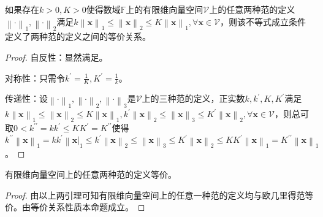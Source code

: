 \documentclass[main.tex]{subfiles}
\begin{document}
\begin{lemma}\label{lem:A.2}
    如果存在$k>0,K>0$使得数域$\mathbb{F}$上的有限维向量空间$\mathcal{V}$上的任意两种范的定义$\left\|\cdot\right\|_1,\left\|\cdot\right\|_2$满足$k\left\|\mathbf{x}\right\|_1\leq\left\|\mathbf{x}\right\|_2\leq K\left\|\mathbf{x}\right\|_1,\forall\mathbf{x}\in\mathcal{V}$，则该不等式成立条件定义了两种范的定义之间的等价关系。
\end{lemma}
\begin{proof}
    自反性：显然满足。

    对称性：只需令$k^\prime=\frac{1}{K},K^\prime=\frac{1}{k}$。

    传递性：设$\left\|\cdot\right\|_1,\left\|\cdot\right\|_2,\left\|\cdot\right\|_3$是$\mathcal{V}$上的三种范的定义，正实数$k,k^\prime,K,K^\prime$满足$k\left\|\mathbf{x}\right\|_1\leq\left\|\mathbf{x}\right\|_2\leq K\left\|\mathbf{x}\right\|_1,k^\prime\left\|\mathbf{x}\right\|_2\leq\left\|\mathbf{x}\right\|_3\leq K^\prime\left\|\mathbf{x}\right\|_2,\forall\mathbf{x}\in\mathcal{V}$，则总可取$0<k^{\prime\prime}=kk^\prime\leq KK^\prime=K^{\prime\prime}$使得$k^{\prime\prime}\left\|\mathbf{x}\right\|_1=kk^\prime\left\|\mathbf{x}\right|_1\leq k^\prime\left\|\mathbf{x}\right\|_2\leq\left\|\mathbf{x}\right\|_3\leq K^\prime\left\|\mathbf{x}\right\|_2\leq KK^\prime\left\|\mathbf{x}\right\|_1=K^{\prime\prime}\left\|\mathbf{x}\right\|_1$。
\end{proof}

\begin{theorem}\label{thm:A.1}
    有限维向量空间上的任意两种范的定义等价。
\end{theorem}
\begin{proof}
    由以上两引理可知有限维向量空间上的任意一种范的定义均与欧几里得范等价。由等价关系性质本命题成立。
\end{proof}
\end{document}
